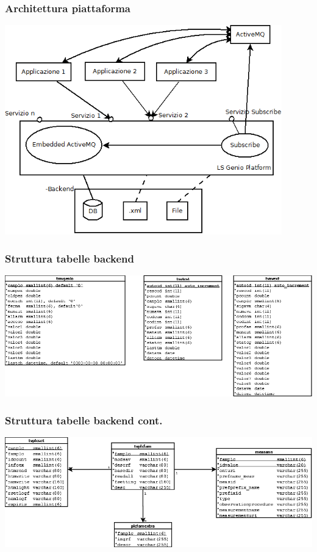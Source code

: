 \documentclass{beamer}
\begin{document}
\begin{frame}
\frametitle{Architettura piattaforma}
\includegraphics[width=0.9\textwidth]{images/architettura_piattaforma.png}
\end{frame}

\begin{frame}
\frametitle{Struttura tabelle backend}
\includegraphics[width=1\textwidth]{images/tabelle-backend.png}
\end{frame}

\begin{frame}
\frametitle{Struttura tabelle backend cont.}
\includegraphics[width=1\textwidth]{images/tabelle-ontologia.png}
\end{frame}
\end{document}
